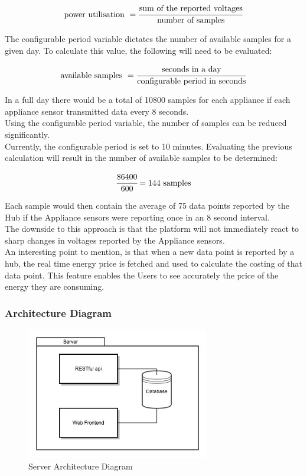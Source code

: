 \documentclass[draft,preprint,12pt,3p]{elsarticle}
\begin{document}
\begin{equation*} 
\text{power utilisation } = \cfrac{\text{sum of the reported voltages}}{\text{number of samples}}
\end{equation*}

The configurable period variable dictates the number of available samples for a given day. To calculate this value, the following will need to be evaluated:

\begin{equation*} 
\text{available samples } = \cfrac{\text{seconds in a day}}{\text{configurable period in seconds}}
\end{equation*}

In a full day there would be a total of 10800 samples for each appliance if each appliance sensor transmitted data every 8 seconds.\\
Using the configurable period variable, the number of samples can be reduced significantly.\\
Currently, the configurable period is set to 10 minutes. Evaluating the previous calculation will result in the number of available samples to be determined:

\begin{equation*} 
 \cfrac{86400}{\text{600}} = 144 \text{ samples}
\end{equation*}

Each sample would then contain the average of 75 data points reported by the Hub if the Appliance sensors were reporting once in an 8 second interval.\\
The downside to this approach is that the platform will not immediately react to sharp changes in voltages reported by the Appliance sensors. \\
An interesting point to mention, is that when a new data point is reported by a hub, the real time energy price is fetched and used to calculate the costing of that data point. This feature enables the Users to see accurately the price of the energy they are consuming. 

\subsubsection{Architecture Diagram}
\begin{figure}[H]
    \centering
    \includegraphics[width=8cm]{diagrams/server}
    \caption {Server Architecture Diagram}
\end{figure}
\end{document}
